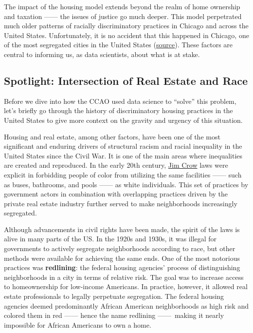 \documentclass[
  letterpaper,
  DIV=11,
  numbers=noendperiod]{scrreprt}
\begin{document}
The impact of the housing model extends beyond the realm of home
ownership and taxation ------ the issues of justice go much deeper. This
model perpetrated much older patterns of racially discriminatory
practices in Chicago and across the United States. Unfortunately, it is
no accident that this happened in Chicago, one of the most segregated
cities in the United States
(\href{https://fivethirtyeight.com/features/the-most-diverse-cities-are-often-the-most-segregated/}{source}).
These factors are central to informing us, as data scientists, about
what is at stake.

\subsection{Spotlight: Intersection of Real Estate and
Race}\label{spotlight-intersection-of-real-estate-and-race}

Before we dive into how the CCAO used data science to ``solve'' this
problem, let's briefly go through the history of discriminatory housing
practices in the United States to give more context on the gravity and
urgency of this situation.

Housing and real estate, among other factors, have been one of the most
significant and enduring drivers of structural racism and racial
inequality in the United States since the Civil War. It is one of the
main areas where inequalities are created and reproduced. In the early
20th century,
\href{https://www.history.com/topics/early-20th-century-us/jim-crow-laws}{Jim
Crow} laws were explicit in forbidding people of color from utilizing
the same facilities ------ such as buses, bathrooms, and pools ------ as
white individuals. This set of practices by government actors in
combination with overlapping practices driven by the private real estate
industry further served to make neighborhoods increasingly segregated.

Although advancements in civil rights have been made, the spirit of the
laws is alive in many parts of the US. In the 1920s and 1930s, it was
illegal for governments to actively segregate neighborhoods according to
race, but other methods were available for achieving the same ends. One
of the most notorious practices was \textbf{redlining}: the federal
housing agencies' process of distinguishing neighborhoods in a city in
terms of relative risk. The goal was to increase access to homeownership
for low-income Americans. In practice, however, it allowed real estate
professionals to legally perpetuate segregation. The federal housing
agencies deemed predominantly African American neighborhoods as high
risk and colored them in red ------ hence the name redlining
------~making it nearly impossible for African Americans to own a home.
\end{document}
